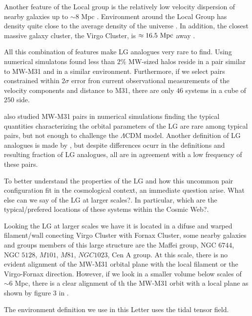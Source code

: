\documentclass{emulateapj}
\newcommand{\lcdm}{$\Lambda$CDM }
\newcommand{\mpc}{\rm{Mpc}}
\newcommand{\hmpc}{{\ifmmode{h^{-1}{\rm Mpc}}\else{$h^{-1}$Mpc }\fi}}
\begin{document}
Another feature of the Local group is the relatively low velocity
dispersion of nearby galaxies up to $\sim 8$ Mpc \citep[][and
  references therein]{1975ApJ...196..313S,2011MNRAS.415L..16A}. 
Environment around the Local Group has density quite close to the
average density of the universe
\citep{2003ApJ...596...19K,2005AJ....129..178K}. In addition, the
closest massive galaxy cluster, the Virgo Cluster, is $\approx
16.5\ \mpc$ away \citep{2007ApJ...655..144M}.  

All this combination of features make LG analogues very rare to
find. Using numerical simulatons \citet{lganalogues} found less than
$2\%$ MW-sized halos reside in a pair similar to MW-M31 and in a
similar environment. Furthermore, if we select pairs constrained
within $2\sigma$ error fron current observational measurements of the
velocity components and distance to M31, there are only $46$ systems
in a cube of $250$ \hmpc side. 

\citet{2013ApJ...767L...5F} also studied MW-M31 pairs in numerical
simulations finding the typical quantities characterizing the orbital
parameters of the LG are rare among typical pairs, but not enough to
challenge the \lcdm model. 
Another definition of LG analogues is made by
\citet{2008MNRAS.384.1459L}, but despite differences ocurr in the
definitions and resulting fraction of LG analogues, all are in
agreement with a low frequency of these pairs. 

To better understand the properties of the LG and how this uncommon
pair configuration fit in the cosmological context, an immediate
question arise. What else can we say of the LG at larger scales?. In
particular, which are the typical/prefered locations of these systems
within the Cosmic Web?.

Looking the LG at larger scales we have it is located in a difuse and
warped filament/wall conecting Virgo Cluster with Fornax Cluster, some
nearby galaxies and groups members of this large structure are the
Maffei group, NGC $6744$, NGC $5128$, $M101$, $M81$, $NGC1023$, Cen A
group. At this scale, there is no evident alignment of the MW-M31
orbital plane with the local filament or the Virgo-Fornax
direction. However, if we look in a smaller volume below scales of
$\sim 6$ \mpc, there is a clear alignment of th the MW-M31 orbit with
a local plane as shown by figure $3$ in \citet{2013AJ....146...69C}.  


The environment definition we use in this Letter uses the tidal tensor
field. 
\end{document}
